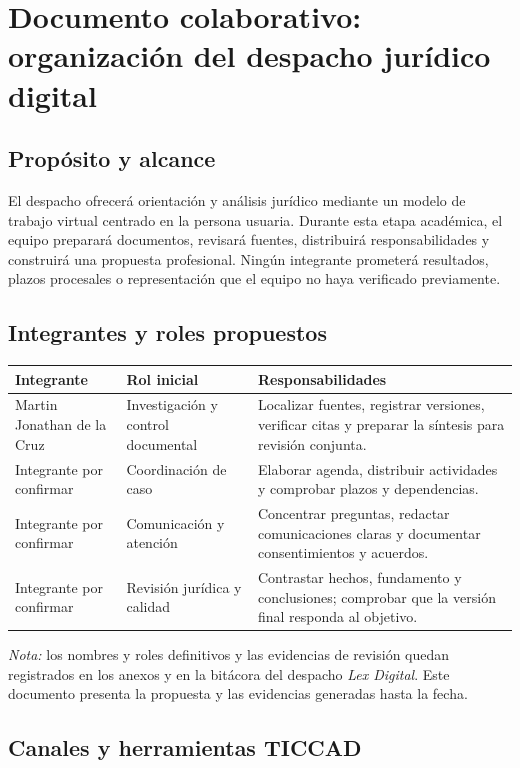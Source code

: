 \documentclass[
  spanish,
  letterpaper, oneside
]{article}
\begin{document}
\section{Documento colaborativo: organización del despacho jurídico digital}

\subsection{Propósito y alcance}

El despacho ofrecerá orientación y análisis jurídico mediante un modelo de trabajo
virtual centrado en la persona usuaria. Durante esta etapa académica, el equipo
preparará documentos, revisará fuentes, distribuirá responsabilidades y construirá
una propuesta profesional. Ningún integrante prometerá resultados, plazos procesales
o representación que el equipo no haya verificado previamente.

\subsection{Integrantes y roles propuestos}

\begin{tabularx}{\textwidth}{p{3cm}p{3.6cm}X}
\toprule
\textbf{Integrante} & \textbf{Rol inicial} & \textbf{Responsabilidades} \\
\midrule
Martin Jonathan de la Cruz & Investigación y control documental & Localizar fuentes, registrar versiones, verificar citas y preparar la síntesis para revisión conjunta. \\
Integrante por confirmar & Coordinación de caso & Elaborar agenda, distribuir actividades y comprobar plazos y dependencias. \\
Integrante por confirmar & Comunicación y atención & Concentrar preguntas, redactar comunicaciones claras y documentar consentimientos y acuerdos. \\
Integrante por confirmar & Revisión jurídica y calidad & Contrastar hechos, fundamento y conclusiones; comprobar que la versión final responda al objetivo. \\
\bottomrule
\end{tabularx}

\textit{Nota:} los nombres y roles definitivos y las evidencias de revisión quedan
registrados en los anexos y en la bitácora del despacho \textit{Lex Digital}. Este
documento presenta la propuesta y las evidencias generadas hasta la fecha.

\subsection{Canales y herramientas TICCAD}
\end{document}
